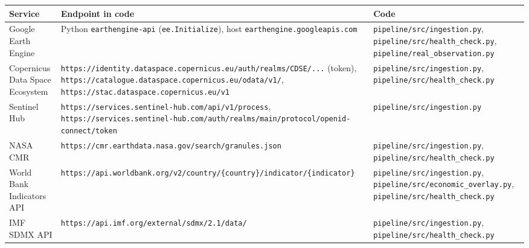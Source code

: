 {\small
\begin{longtable}{>{\raggedright\arraybackslash}p{3.45cm}>{\raggedright\arraybackslash}p{5.17cm}>{\raggedright\arraybackslash}p{5.17cm}}
\toprule
Service & Endpoint in code & Code \\
\midrule
\endhead
Google Earth Engine & Python \texttt{earthengine-api} (\texttt{ee.Initialize}), host \texttt{earthengine.googleapis.com} & \texttt{pipeline/\allowbreak{}src/\allowbreak{}ingestion.py}, \texttt{pipeline/\allowbreak{}src/\allowbreak{}health\_check.py}, \texttt{pipeline/\allowbreak{}real\_observation.py} \\
Copernicus Data Space Ecosystem & \texttt{https:/\allowbreak{}/\allowbreak{}identity.dataspace.copernicus.eu/\allowbreak{}auth/\allowbreak{}realms/\allowbreak{}CDSE/\allowbreak{}...} (token), \texttt{https:/\allowbreak{}/\allowbreak{}catalogue.dataspace.copernicus.eu/\allowbreak{}odata/\allowbreak{}v1/\allowbreak{}}, \texttt{https:/\allowbreak{}/\allowbreak{}stac.dataspace.copernicus.eu/\allowbreak{}v1} & \texttt{pipeline/\allowbreak{}src/\allowbreak{}ingestion.py}, \texttt{pipeline/\allowbreak{}src/\allowbreak{}health\_check.py} \\
Sentinel Hub & \texttt{https:/\allowbreak{}/\allowbreak{}services.sentinel-hub.com/\allowbreak{}api/\allowbreak{}v1/\allowbreak{}process}, \texttt{https:/\allowbreak{}/\allowbreak{}services.sentinel-hub.com/\allowbreak{}auth/\allowbreak{}realms/\allowbreak{}main/\allowbreak{}protocol/\allowbreak{}openid-connect/\allowbreak{}token} & \texttt{pipeline/\allowbreak{}src/\allowbreak{}ingestion.py} \\
NASA CMR & \texttt{https:/\allowbreak{}/\allowbreak{}cmr.earthdata.nasa.gov/\allowbreak{}search/\allowbreak{}granules.json} & \texttt{pipeline/\allowbreak{}src/\allowbreak{}ingestion.py}, \texttt{pipeline/\allowbreak{}src/\allowbreak{}health\_check.py} \\
World Bank Indicators API & \texttt{https:/\allowbreak{}/\allowbreak{}api.worldbank.org/\allowbreak{}v2/\allowbreak{}country/\allowbreak{}\{country\}/\allowbreak{}indicator/\allowbreak{}\{indicator\}} & \texttt{pipeline/\allowbreak{}src/\allowbreak{}ingestion.py}, \texttt{pipeline/\allowbreak{}src/\allowbreak{}economic\_overlay.py}, \texttt{pipeline/\allowbreak{}src/\allowbreak{}health\_check.py} \\
IMF SDMX API & \texttt{https:/\allowbreak{}/\allowbreak{}api.imf.org/\allowbreak{}external/\allowbreak{}sdmx/\allowbreak{}2.1/\allowbreak{}data/\allowbreak{}} & \texttt{pipeline/\allowbreak{}src/\allowbreak{}ingestion.py}, \texttt{pipeline/\allowbreak{}src/\allowbreak{}health\_check.py} \\

\end{longtable}}
